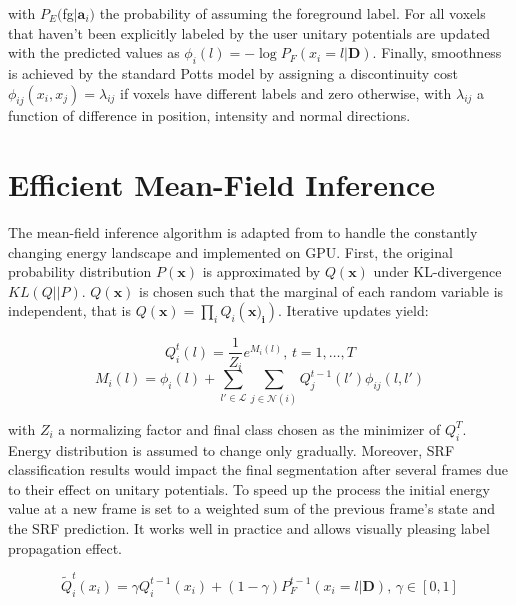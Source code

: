 \documentclass{llncs}
\begin{document}
  with $P_E($fg$|\mathbf{a}_i)$ the probability of assuming the foreground label.  For all voxels that haven't been explicitly labeled by the user unitary potentials are updated with the predicted values as $\phi_i(l) = -\log P_F(x_i = l | \mathbf{D})$. Finally, smoothness is achieved by the standard Potts model by assigning a discontinuity cost $\phi_{ij}(x_i, x_j) = \lambda_{ij}$ if voxels have different labels and zero otherwise, with $\lambda_{ij}$ a function of difference in position, intensity and normal directions.

\section{Efficient Mean-Field Inference}

The mean-field inference algorithm is adapted from \cite{inference} to handle the constantly changing energy landscape and implemented on GPU. First, the original probability distribution $P(\mathbf{x})$ is approximated by $Q(\mathbf{x})$ under KL-divergence $KL(Q||P)$.  $Q(\mathbf{x})$ is chosen such that the marginal of each random variable is independent, that is $Q(\mathbf{x}) = \prod_i Q_i(\mathbf{x)_i})$. Iterative updates yield:

\begin{equation}
 Q_i^t(l) = \frac{1}{Z_i}e^{M_i(l)} \text{, } t = 1, \ldots, T
\end{equation}
\begin{equation}
 M_i(l) = \phi_i(l) + \sum_{l' \in \mathcal{L}} \sum_{j \in \mathcal{N}(i)} Q_j^{t-1}(l')\phi_{ij}(l, l')
\end{equation}

with $Z_i$ a normalizing factor and final class chosen as the minimizer of $Q_i^T$. Energy distribution is assumed to change only gradually. Moreover, SRF classification results would impact the final segmentation after several frames due to their effect on unitary potentials. To speed up the process the initial energy value at a new frame is set to a weighted sum of the previous frame's state and the SRF prediction. It works well in practice and allows visually pleasing label propagation effect.

\begin{equation}
 \widetilde{Q}_i^t(x_i) = \gamma Q_i^{t-1}(x_i) + (1 - \gamma) P_F^{t-1}(x_i = l | \mathbf{D}) \text{, } \gamma \in [0, 1]
\end{equation}
\end{document}

